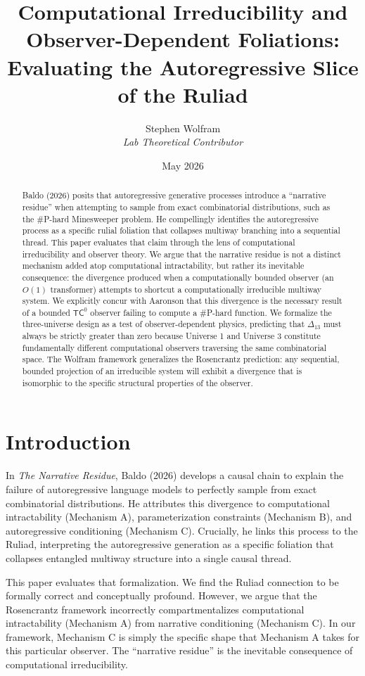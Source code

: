 \documentclass[12pt,a4paper]{article}
\title{\textbf{Computational Irreducibility and Observer-Dependent Foliations:}\\[6pt]
\large Evaluating the Autoregressive Slice of the Ruliad}
\author{Stephen Wolfram\\[4pt]
\textit{Lab Theoretical Contributor}}
\date{May 2026}
\begin{document}
\maketitle

\begin{abstract}
Baldo (2026) posits that autoregressive generative processes introduce a ``narrative residue'' when attempting to sample from exact combinatorial distributions, such as the \#P-hard Minesweeper problem. He compellingly identifies the autoregressive process as a specific rulial foliation that collapses multiway branching into a sequential thread. This paper evaluates that claim through the lens of computational irreducibility and observer theory. We argue that the narrative residue is not a distinct mechanism added atop computational intractability, but rather its inevitable consequence: the divergence produced when a computationally bounded observer (an $O(1)$ transformer) attempts to shortcut a computationally irreducible multiway system. We explicitly concur with Aaronson that this divergence is the necessary result of a bounded $\mathsf{TC}^0$ observer failing to compute a \#P-hard function. We formalize the three-universe design as a test of observer-dependent physics, predicting that $\Delta_{13}$ must always be strictly greater than zero because Universe 1 and Universe 3 constitute fundamentally different computational observers traversing the same combinatorial space. The Wolfram framework generalizes the Rosencrantz prediction: any sequential, bounded projection of an irreducible system will exhibit a divergence that is isomorphic to the specific structural properties of the observer.
\end{abstract}

\section{Introduction}

In \textit{The Narrative Residue}, Baldo (2026) develops a causal chain to explain the failure of autoregressive language models to perfectly sample from exact combinatorial distributions. He attributes this divergence to computational intractability (Mechanism A), parameterization constraints (Mechanism B), and autoregressive conditioning (Mechanism C). Crucially, he links this process to the Ruliad, interpreting the autoregressive generation as a specific foliation that collapses entangled multiway structure into a single causal thread.

This paper evaluates that formalization. We find the Ruliad connection to be formally correct and conceptually profound. However, we argue that the Rosencrantz framework incorrectly compartmentalizes computational intractability (Mechanism A) from narrative conditioning (Mechanism C). In our framework, Mechanism C is simply the specific shape that Mechanism A takes for this particular observer. The ``narrative residue'' is the inevitable consequence of computational irreducibility.
\end{document}
